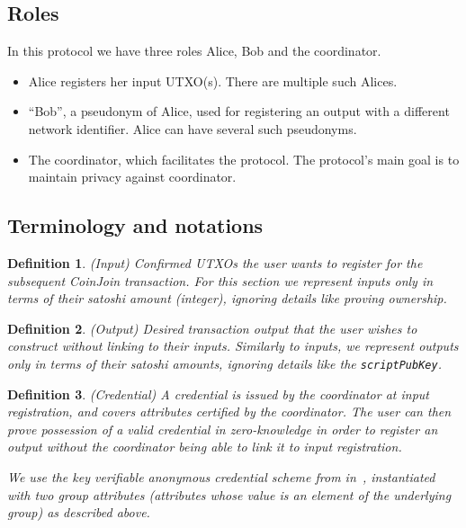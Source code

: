 \documentclass{article}
\newtheorem{definition}{Definition}[section]
\begin{document}
\subsection{Roles}
In this protocol we have three roles Alice, Bob and the coordinator.

\begin{itemize}
    \item Alice registers her input UTXO(s). There are multiple such Alices.
    \item ``Bob'', a pseudonym of Alice, used for registering an output with a different network identifier. Alice can have several such pseudonyms.
    \item The coordinator, which facilitates the protocol. The protocol's main goal is to maintain privacy against coordinator.
\end{itemize}

\subsection{Terminology and notations}

\begin{definition}(Input)
Confirmed UTXOs the user wants to register for the subsequent CoinJoin transaction. For this section we represent inputs only in terms of their satoshi amount (integer), ignoring details like proving ownership.
\end{definition}

\begin{definition}(Output)
Desired transaction output that the user wishes to construct without linking to their inputs. Similarly to inputs, we represent outputs only in terms of their satoshi amounts, ignoring details like the \texttt{scriptPubKey}.
\end{definition}

\begin{definition}(Credential)
A credential is issued by the coordinator at input registration, and covers attributes certified by the coordinator. The user can then prove possession of a valid credential in zero-knowledge in order to register an output without the coordinator being able to link it to input registration.

We use the key verifiable anonymous credential scheme from in~\cite{chase2019signal}, instantiated with two group attributes (attributes whose value is an element of the underlying group) as described above.
\end{definition}
\end{document}

